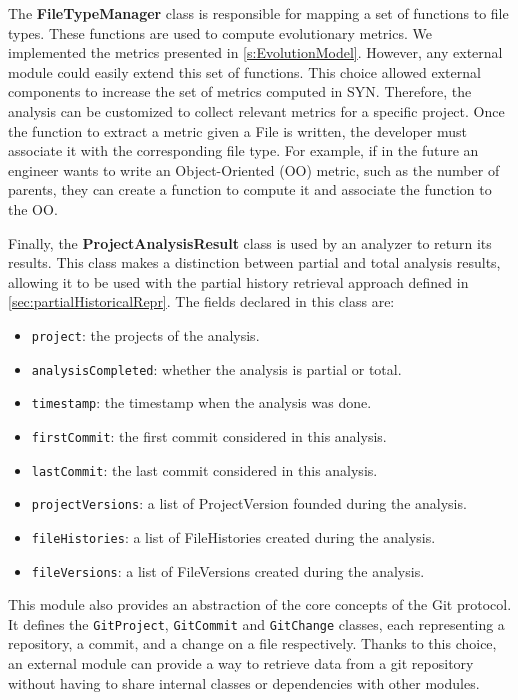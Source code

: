 The \textbf{FileTypeManager} class is responsible for mapping a set of functions to file types. These functions are used to compute evolutionary metrics. We implemented the metrics presented in \autoref{s:EvolutionModel}. However, any external module could easily extend this set of functions. This choice allowed external components to increase the set of metrics computed in SYN. Therefore, the analysis can be customized to collect relevant metrics for a specific project. Once the function to extract a metric given a File is written, the developer must associate it with the corresponding file type. For example, if in the future an engineer wants to write an  Object-Oriented (OO) metric, such as the number of parents, they can create a function to compute it and associate the function to the OO.

Finally, the \textbf{ProjectAnalysisResult} class is used by an analyzer to return its results. This class makes a distinction between partial and total analysis results, allowing it to be used with the partial history retrieval approach defined in \autoref{sec:partialHistoricalRepr}. The fields declared in this class are:
\begin{itemize}
    \item \texttt{project}: the projects of the analysis.
    \item \texttt{analysisCompleted}: whether the analysis is partial or total.
    \item \texttt{timestamp}: the timestamp when the analysis was done. 
    \item \texttt{firstCommit}: the first commit considered in this analysis. 
    \item \texttt{lastCommit}: the last commit considered in this analysis. 
    \item \texttt{projectVersions}: a list of ProjectVersion founded during the analysis.
    \item \texttt{fileHistories}: a list of FileHistories created during the analysis.
    \item \texttt{fileVersions}: a list of FileVersions created during the analysis.
\end{itemize}

This module also provides an abstraction of the core concepts of the Git protocol. It defines the \texttt{GitProject}, \texttt{GitCommit} and \texttt{GitChange} classes, each representing a repository, a commit, and a change on a file respectively. 
Thanks to this choice, an external module can provide a way to retrieve data from a git repository without having to share internal classes or dependencies with other modules. 


